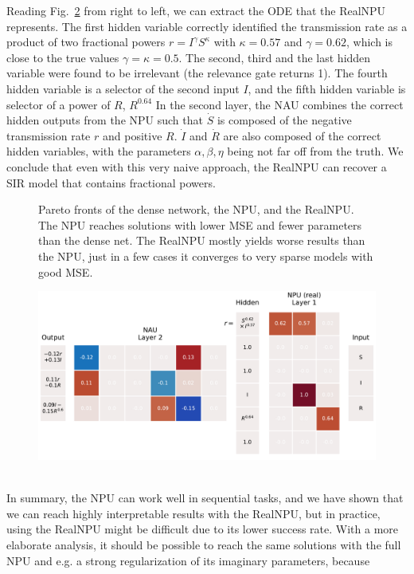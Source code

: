 \documentclass[9pt]{article}
\begin{document}
Reading Fig.~\ref{fig:sir_gatednpu_modelps} from right to left, we can extract
the ODE that the RealNPU represents.  The first hidden variable correctly
identified the transmission rate as a product of two fractional powers $r =
I^\gamma S^\kappa$ with $\kappa=0.57$ and $\gamma=0.62$, which is close to the
true values $\gamma=\kappa=0.5$. The second, third and the last hidden variable
were found to be irrelevant (the relevance gate returns 1). The fourth hidden
variable is a selector of the second input $I$, and the fifth hidden variable
is selector of a power of $R$, $R^{0.64}$ In the second layer, the NAU combines
the correct hidden outputs from the NPU such that $\dot S$ is composed of the
negative transmission rate $r$ and positive $R$.  $\dot I$ and $\dot R$ are
also composed of the correct hidden variables, with the parameters
$\alpha,\beta,\eta$ being not far off from the truth.  We conclude that even
with this very naive approach, the RealNPU can recover a SIR model that
contains fractional powers. 
\begin{figure}
  \centering
  \resizebox{.7\textwidth}{!}{}
  \caption{Pareto fronts of the dense network, the NPU, and the RealNPU. The
  NPU reaches solutions with lower  MSE and fewer parameters than the dense
  net. The RealNPU mostly yields   worse results than the NPU, just in a few
  cases it converges to very sparse models with good MSE.}%
  \label{fig:pareto_sir}
\end{figure}
\begin{figure}
  \centering
  \includegraphics[width=.6\linewidth]{../plots/sir_gatednpu_modelps.pdf}
  \label{fig:sir_gatednpu_modelps}
\end{figure}
\\
In summary, the NPU can work well in sequential tasks, and we have shown
that we can reach highly interpretable results with the RealNPU, but in practice,
using the RealNPU might be difficult due to its lower success rate. With a more
elaborate analysis, it should be possible to reach the same solutions with the
full NPU and e.g. a strong regularization of its imaginary parameters, because
\end{document}
